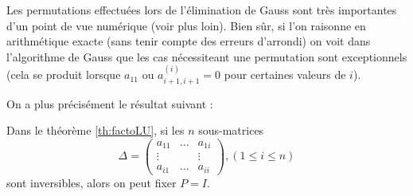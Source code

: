 \documentclass[a4paper,11pt]{article}
\theoremstyle{plain} %
\begin{document}
\vspace{0.7cm}
Les permutations effectuées lors de l'élimination de Gauss sont très importantes d'un point de vue numérique (voir plus loin).
Bien sûr, si l'on raisonne en arithmétique exacte (sans tenir compte des erreurs d'arrondi)
on voit dans l'algorithme de Gauss que les cas nécessiteant une permutation sont
exceptionnels (cela se produit lorsque $a_{11}$ ou $a^{(i)}_{i+1,i+1}=0$ pour certaines valeurs de $i$).

On a plus précisément le résultat suivant :

\begin{ftheo}
    Dans le théorème \ref{th:factoLU}, si les $n$ sous-matrices
    \[\Delta = \begin{pmatrix}
        a_{11} & \dots & a_{1i} \\
        \vdots & & \vdots \\
        a_{i1} & \dots & a_{ii}
    \end{pmatrix}
, (1 \leq i \leq n)\]
    sont inversibles, alors on peut fixer $P = I$.
\end{ftheo}
\end{document}
